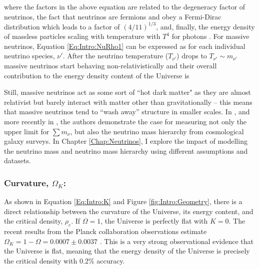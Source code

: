 where the factors in the above equation are related to the degeneracy factor of neutrinos, the fact that neutrinos are fermions and obey a Fermi-Dirac distribution which leads to a factor of $(4/11)^{1/3}$, and, finally, the energy density of massless particles scaling with temperature with $T^{4}$ for photons \citep{dods}. For massive neutrinos, Equation \eqref{Eq:Intro:NuRho1} can be expressed as 
for each individual neutrino species, $\nu'$. After the neutrino temperature ($T_{\nu'}$) drops to $T_{\nu'} \sim  m_{\nu'}$ massive neutrinos start behaving non-relativistically and their overall contribution to the energy density content of the Universe is \citep{2003HannestadNeutrino}



\qquad Still, massive neutrinos act as some sort of ``hot dark matter" as they are almost relativist but barely interact with matter other than gravitationally -- this means that massive neutrinos tend to ``wash away'' structure in smaller scales. In \cite{2003HannestadNeutrino}, and more recently in \cite{2016JCAP...11..035H}, the authors demonstrate the case for measuring not only the upper limit for $\sum m_{\nu}$, but also the neutrino mass hierarchy from cosmological galaxy surveys. In Chapter \ref{Chap:Neutrinos}, I explore the impact of modelling the neutrino mass and neutrino mass hierarchy using different assumptions and datasets.


\subsubsection{Curvature, $\Omega_K$:}
As shown in Equation \eqref{Eq:Intro:K} and Figure \ref{fig:Intro:Geometry}, there is a direct relationship between the curvature of the Universe, its energy content, and the critical density, $\rho_c$. If $\Omega = 1$, the Universe is perfectly flat with $K=0$. The recent results from the Planck collaboration observations estimate $\Omega_K = 1 - \Omega = 0.0007\pm 0.0037$ \citep{2018PlanckCosmology}. This is a very strong observational evidence that the Universe is flat, meaning that the energy density of the Universe is precisely the critical density with 0.2\% accuracy. 

\vspace{5mm}

